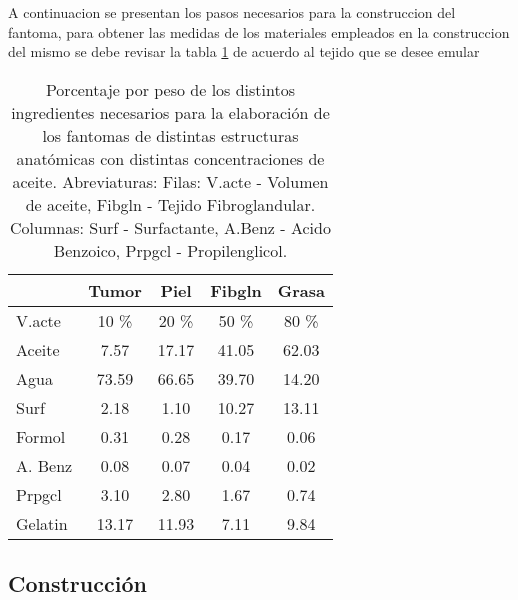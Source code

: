 A continuacion se presentan los pasos necesarios para la construccion del fantoma, para obtener las medidas de los materiales empleados en la construccion del mismo se debe revisar la tabla \ref{tab:porcentajePesoIngredientes} de acuerdo al tejido que se desee emular

\begin{table}[H]
 \centering \caption{Porcentaje por peso de los distintos ingredientes necesarios para la elaboración de los fantomas de distintas estructuras anatómicas con distintas concentraciones de aceite. Abreviaturas: Filas: V.acte - Volumen de aceite, Fibgln - Tejido Fibroglandular.  Columnas: Surf - Surfactante, A.Benz - Acido Benzoico, Prpgcl - Propilenglicol.}
 \label{tab:porcentajePesoIngredientes}
\begin{tabular}{lcccc}
\hline
	     & Tumor	&	Piel	&	Fibgln &	Grasa	\\
\hline
\hline
V.acte  &	10 \%	&	20 \%	&	50 \%	 &	80 \%	\\
\hline
Aceite  &	7.57	&	17.17	&	41.05	 &	62.03	\\
Agua    &	73.59	&	66.65	&	39.70	 &	14.20	\\
Surf 	  &	2.18	&	1.10	&	10.27	 &	13.11	\\
Formol  &	0.31	&	0.28	&	0.17	 &	0.06	\\
A. Benz &	0.08	&	0.07	&	0.04	 &	0.02	\\
Prpgcl 	&	3.10	&	2.80	&	1.67	 &	0.74	\\
Gelatin &	13.17	&	11.93	&	7.11	 &	9.84	\\
\hline
\end{tabular}
\end{table}

\subsection{Construcción}


